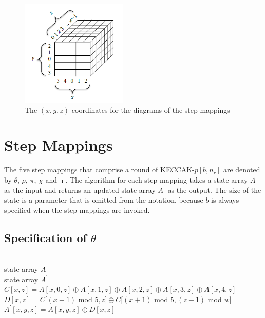 \documentclass[12pt,a4paper,oneside]{report}
\begin{document}
\begin{figure}[H]
\centering
\includegraphics[width=2in]{imgs/xyz.png}
\caption{The $(x,y,z)$ coordinates for the diagrams of the step mappings} 
\end{figure}

\section{Step Mappings}
The five step mappings that comprise a round of KECCAK-$p[b, n_r]$ are denoted by $\theta$, $\rho$, $\pi$, $\chi$ and $\imath$. The algorithm for each step mapping takes a state array $A$ as the input and returns an updated state array $A^{'}$ as the output. The size of the state is a parameter that is omitted from the notation, because $b$ is always specified when the step mappings are invoked.

\subsection{Specification of $\theta$}
\begin{algorithm}[H]
    \begin{algorithmic}
        \Require \\
        state array $A$
        \Ensure \\
        state array $A^{'}$
                \State $C[x,z]=A[x,0,z] \oplus A[x,1,z] \oplus A[x,2,z] \oplus A[x,3,z] \oplus A[x,4,z]$
                \State $D[x,z]=C[(x-1)$ mod $5,z] \oplus C[(x+1)$ mod $5, (z-1)$ mod $w]$
            \EndFor
                \State $A^{'}[x,y,z]=A[x,y,z] \oplus D[x,z]$
            \EndFor
            \State {}  
        \EndFunction  
    \end{algorithmic}  
\end{algorithm}
\end{document}
